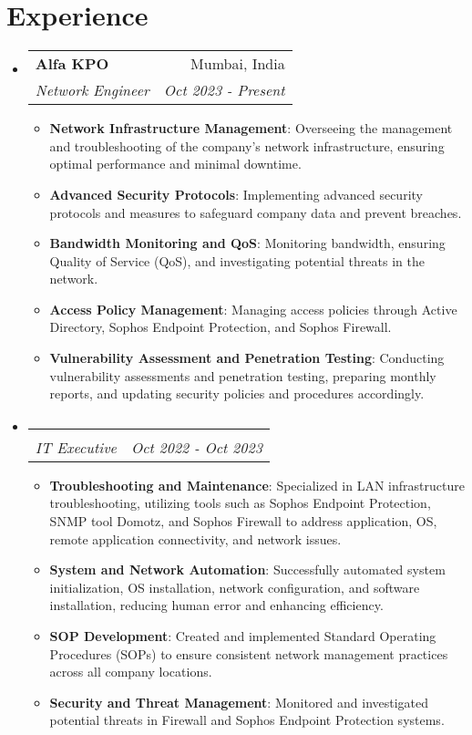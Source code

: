 \documentclass[letterpaper,11pt]{article}
\makeatletter
\newcommand{\resumeItem}[2]{
  \item\small{
    \textbf{#1}{: #2 \vspace{-2pt}}
  }
}
\newcommand{\resumeSubheading}[4]{
  \vspace{-1pt}\item
    \begin{tabular*}{0.97\textwidth}[t]{l@{\extracolsep{\fill}}r}
      \textbf{#1} & #2 \\
      \textit{\small#3} & \textit{\small #4} \\
    \end{tabular*}\vspace{-5pt}
}
\newcommand{\resumeSubHeadingListStart}{\begin{itemize}[leftmargin=*]}
\newcommand{\resumeSubHeadingListEnd}{\end{itemize}}
\newcommand{\resumeItemListStart}{\begin{itemize}}
\newcommand{\resumeItemListEnd}{\end{itemize}\vspace{-5pt}}
\makeatother
\begin{document}
\section{Experience}
  \resumeSubHeadingListStart

    \resumeSubheading
      {Alfa KPO}{Mumbai, India}
      {Network Engineer}{Oct 2023 - Present}
      \resumeItemListStart
        \resumeItem{Network Infrastructure Management}
          {Overseeing the management and troubleshooting of the company’s network infrastructure, ensuring optimal performance and minimal downtime.}
        \resumeItem{Advanced Security Protocols}
          {Implementing advanced security protocols and measures to safeguard company data and prevent breaches.}
        \resumeItem{Bandwidth Monitoring and QoS}
          {Monitoring bandwidth, ensuring Quality of Service (QoS), and investigating potential threats in the network.}
        \resumeItem{Access Policy Management}
          {Managing access policies through Active Directory, Sophos Endpoint Protection, and Sophos Firewall.}
          \resumeItem{Vulnerability Assessment and Penetration Testing}
          {Conducting vulnerability assessments and penetration testing, preparing monthly reports, and updating security policies and procedures accordingly.}
      \resumeItemListEnd

    \resumeSubheading
      {}{}
      {IT Executive}{Oct 2022 - Oct 2023}
      \resumeItemListStart
        \resumeItem{Troubleshooting and Maintenance}
          {Specialized in LAN infrastructure troubleshooting, utilizing tools such as Sophos Endpoint Protection, SNMP tool Domotz, and Sophos Firewall to address application, OS, remote application connectivity, and network issues.}
        \resumeItem{System and Network Automation}
          {Successfully automated system initialization, OS installation, network configuration, and software installation, reducing human error and enhancing efficiency.}
        \resumeItem{SOP Development}
          {Created and implemented Standard Operating Procedures (SOPs) to ensure consistent network management practices across all company locations.}
        \resumeItem{Security and Threat Management}
          {Monitored and investigated potential threats in Firewall and Sophos Endpoint Protection systems.}
      \resumeItemListEnd

  \resumeSubHeadingListEnd



\end{document}
